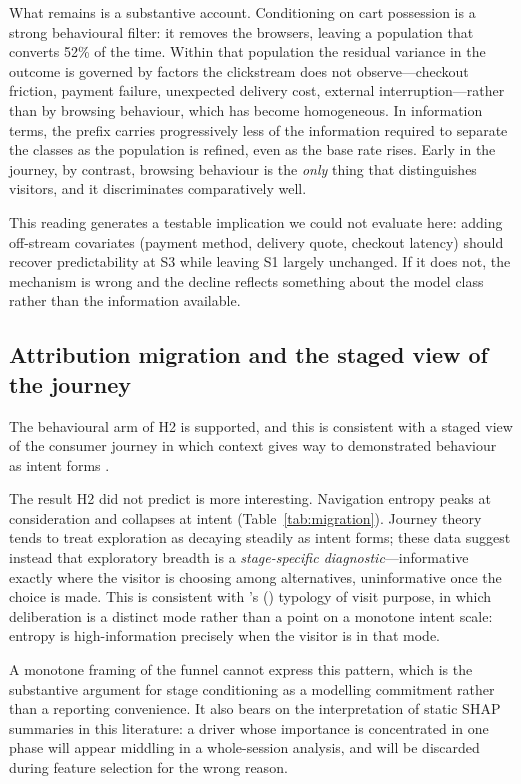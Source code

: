 \documentclass[review,3p,times,authoryear]{elsarticle}   %
\begin{document}
What remains is a substantive account. Conditioning on cart possession is a strong
behavioural filter: it removes the browsers, leaving a population that converts
52\% of the time. Within that population the residual variance in the outcome is
governed by factors the clickstream does not observe---checkout friction, payment
failure, unexpected delivery cost, external interruption---rather than by browsing
behaviour, which has become homogeneous. In information terms, the prefix carries
progressively less of the information required to separate the classes as the
population is refined, even as the base rate rises. Early in the journey, by
contrast, browsing behaviour is the \emph{only} thing that distinguishes visitors,
and it discriminates comparatively well.

This reading generates a testable implication we could not evaluate here: adding
off-stream covariates (payment method, delivery quote, checkout latency) should
recover predictability at S3 while leaving S1 largely unchanged. If it does not,
the mechanism is wrong and the decline reflects something about the model class
rather than the information available.

\subsection{Attribution migration and the staged view of the journey}

The behavioural arm of H2 is supported, and this is consistent with a staged view of
the consumer journey in which context gives way to demonstrated behaviour as intent
forms \citep{lemon2016understanding,moe2003buying}.

The result H2 did not predict is more interesting. Navigation entropy peaks at
consideration and collapses at intent (Table~\ref{tab:migration}). Journey theory
tends to treat exploration as decaying steadily as intent forms; these data suggest
instead that exploratory breadth is a \emph{stage-specific diagnostic}---informative
exactly where the visitor is choosing among alternatives, uninformative once the
choice is made. This is consistent with \citeauthor{moe2003buying}'s
(\citeyear{moe2003buying}) typology of visit purpose, in which deliberation is a
distinct mode rather than a point on a monotone intent scale: entropy is
high-information precisely when the visitor is in that mode.

A monotone framing of the funnel cannot express this pattern, which is the
substantive argument for stage conditioning as a modelling commitment rather than a
reporting convenience. It also bears on the interpretation of static SHAP summaries
in this literature: a driver whose importance is concentrated in one phase will
appear middling in a whole-session analysis, and will be discarded during feature
selection for the wrong reason.
\end{document}
